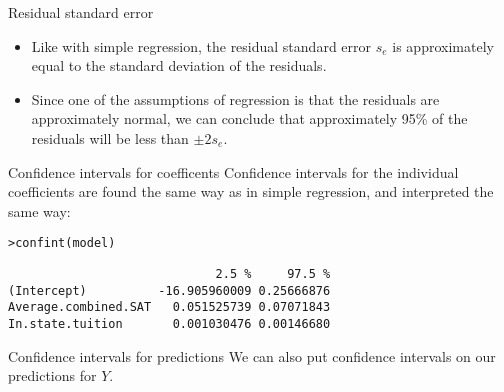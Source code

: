 \documentclass{beamer}\usepackage[]{graphicx}\usepackage[]{color}
\makeatletter
\newcommand{\hlstd}[1]{\textcolor[rgb]{1,0.894,0.769}{#1}}%
\newcommand{\hlkwd}[1]{\textcolor[rgb]{1,0.78,0.769}{#1}}%
\newenvironment{kframe}{%
 \def\at@end@of@kframe{}%
 \ifinner\ifhmode%
  \def\at@end@of@kframe{\end{minipage}}%
  \begin{minipage}{\columnwidth}%
 \fi\fi%
 \def\FrameCommand##1{\hskip\@totalleftmargin \hskip-\fboxsep
 \colorbox{shadecolor}{##1}\hskip-\fboxsep
     \hskip-\linewidth \hskip-\@totalleftmargin \hskip\columnwidth}%
 \MakeFramed {\advance\hsize-\width
   \@totalleftmargin\z@ \linewidth\hsize
   \@setminipage}}%
 {\par\unskip\endMakeFramed%
 \at@end@of@kframe}
\newenvironment{knitrout}{}{} %
\makeatother
\begin{document}
\begin{darkframes}

    \begin{frame}{Residual standard error}
      \begin{itemize}[<+->]
        \item Like with simple regression, the \alert{residual standard error} $s_e$ is approximately equal to the standard deviation of the residuals.
        \item Since one of the assumptions of regression is that the residuals are approximately normal, we can conclude that approximately 95\% of the residuals will be less than $\pm 2s_e$.
      \end{itemize}
    \end{frame}

    \begin{frame}[fragile]{Confidence intervals for coefficents}
      Confidence intervals for the individual coefficients are found the same way as in simple regression, and interpreted the same way:
\begin{knitrout}
\begin{kframe}
\begin{alltt}
\hlstd{> }\hlkwd{confint}\hlstd{(model)}
\end{alltt}
\begin{verbatim}
                             2.5 %     97.5 %
(Intercept)          -16.905960009 0.25666876
Average.combined.SAT   0.051525739 0.07071843
In.state.tuition       0.001030476 0.00146680
\end{verbatim}
\end{kframe}
\end{knitrout}
    \end{frame}

    \begin{frame}[fragile]{Confidence intervals for predictions}
      \fontsm
      We can also put confidence intervals on our predictions for $Y$.


\end{frame}
\end{darkframes}
\end{document}
